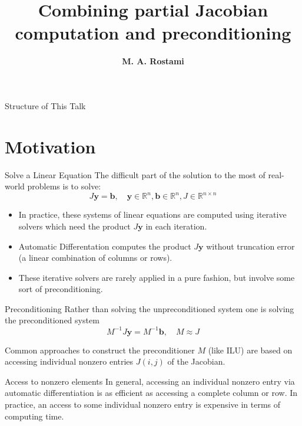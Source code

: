 \documentclass{beamer}
\title[]
{Combining partial Jacobian computation and preconditioning}
\author[\textbf{Rostami}]{{\bf M. A. Rostami}}
\institute[FSU Jena]{
f  Chair of Advanced Computing\\
  Friedrich Schiller University Jena, Germany\\[1ex]
  \texttt{a.rostami@uni-jena.de}
}
\newcommand{\vek}[1]{{\ensuremath{\mathbf #1}}}
\newcommand{\R}{\ensuremath{\field{R}}}
\newcommand{\field}[1]{\mathbb{#1}}
\begin{document}
\begin{frame}[plain]
  \titlepage
\end{frame}

\begin{frame}{Structure of This Talk}
\tableofcontents
\end{frame}

\section{Motivation}
\begin{frame}{Solve a Linear Equation}
The difficult part of the solution to the most of real-world problems is to solve:
$$J \vek{y}=\vek{b},\quad \vek{y} \in \R^n, \vek{b} \in \R^n, J \in \R^{n \times n}$$
\begin{itemize}
\item In practice, these systems of linear equations are computed using iterative solvers which
need the product $J \vek{y}$ in each iteration.
\item Automatic Differentation computes the product $J \vek{y}$ without truncation error (a linear combination of columns or rows).
\item These iterative solvers are rarely applied in a pure fashion, but involve some sort of
preconditioning.
\end{itemize}
\end{frame}


\begin{frame}{Preconditioning}
Rather than solving the unpreconditioned system one is solving the preconditioned system
$$M^{-1} J \vek{y}= M^{-1}\vek{b},\quad M \approx J$$

Common approaches to construct the preconditioner $M$ (like ILU) are based on accessing individual
nonzero entries $J(i,j)$ of the Jacobian.

\begin{alertblock}{Access to nonzero elements}
 In general, accessing an
individual nonzero entry via automatic differentiation is as efficient as accessing a
complete column or row. In practice, an access to some individual nonzero entry is
 expensive in terms of computing time.
\end{alertblock}
\end{frame}
\end{document}
